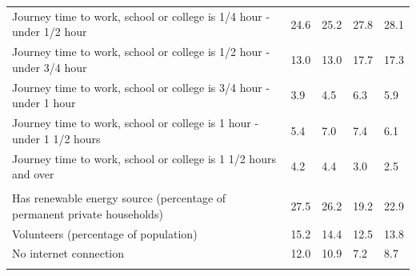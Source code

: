 \documentclass{article}
\begin{document}
\begin{table}[h]
\begin{tabular}{KTTTT}
Journey time to work, school or college is 1/4 hour - under 1/2 hour & 24.6& 25.2& 27.8& 28.1\\
Journey time to work, school or college is 1/2 hour - under 3/4 hour & 13.0& 13.0& 17.7& 17.3\\
Journey time to work, school or college is 3/4 hour - under 1 hour & 3.9& 4.5& 6.3& 5.9\\
Journey time to work, school or college is 1 hour - under 1 1/2 hours & 5.4& 7.0& 7.4& 6.1\\
Journey time to work, school or college is 1 1/2 hours and over & 4.2& 4.4& 3.0& 2.5\\
\hline
    \\ 
    \hline
Has renewable energy source (percentage of permanent private households) & 27.5& 26.2& 19.2& 22.9\\
    \hline
Volunteers (percentage of population) & 15.2& 14.4& 12.5& 13.8\\
    \hline
No internet connection& 12.0& 10.9&  7.2&  8.7\\
\hline
\end{tabular}
\end{table}
\end{document}
